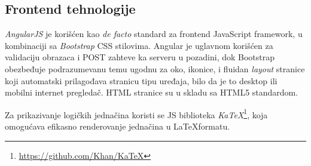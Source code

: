 \subsection{Frontend tehnologije}

\emph{AngularJS}\cite{angularjs} je korišćen kao \textit{de facto} standard za frontend JavaScript framework, u kombinaciji sa \emph{Bootstrap}\cite{bootstrap} CSS stilovima. Angular je uglavnom korišćen za validaciju obrazaca i POST zahteve ka serveru u pozadini, dok Bootstrap obezbeđuje podrazumevanu temu ugodnu za oko, ikonice, i fluidan \textit{layout} stranice koji automatski prilagođava stranicu tipu uređaja, bilo da je to desktop ili mobilni internet pregledač. HTML stranice su u skladu sa HTML5 standardom.

Za prikazivanje logičkih jednačina koristi se JS biblioteka \emph{KaTeX}\footnote{\url{https://github.com/Khan/KaTeX}}, koja omogućava efikasno renderovanje jednačina u \LaTeX formatu.
